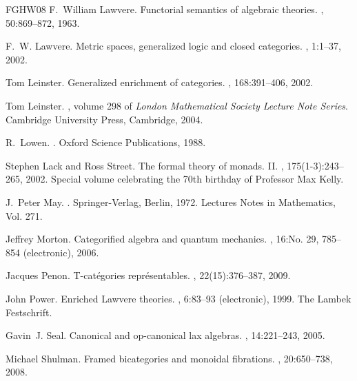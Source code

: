 \documentclass{tac}
\numberwithin{equation}{section}
\begin{document}
\begin{thebibliography}{FGHW08}
F.~William Lawvere.
\newblock Functorial semantics of algebraic theories.
, 50:869--872, 1963.

F.~W. Lawvere.
\newblock Metric spaces, generalized logic and closed categories.
, 1:1--37,
  2002.

Tom Leinster.
\newblock Generalized enrichment of categories.
, 168:391--406, 2002.

Tom Leinster.
, volume 298 of {\em London
  Mathematical Society Lecture Note Series}.
\newblock Cambridge University Press, Cambridge, 2004.

R.~Lowen.
.
\newblock Oxford Science Publications, 1988.

Stephen Lack and Ross Street.
\newblock The formal theory of monads. {II}.
, 175(1-3):243--265, 2002.
\newblock Special volume celebrating the 70th birthday of Professor Max Kelly.

J.~Peter May.
.
\newblock Springer-Verlag, Berlin, 1972.
\newblock Lectures Notes in Mathematics, Vol. 271.

Jeffrey Morton.
\newblock Categorified algebra and quantum mechanics.
, 16:No. 29, 785--854 (electronic), 2006.

Jacques Penon.
\newblock T-cat\'egories repr\'esentables.
, 22(15):376--387, 2009.

John Power.
\newblock Enriched {L}awvere theories.
, 6:83--93 (electronic), 1999.
\newblock The Lambek Festschrift.

Gavin~J. Seal.
\newblock Canonical and op-canonical lax algebras.
, 14:221--243, 2005.

Michael Shulman.
\newblock Framed bicategories and monoidal fibrations.
, 20:650--738, 2008.


\end{thebibliography}
\end{document}
